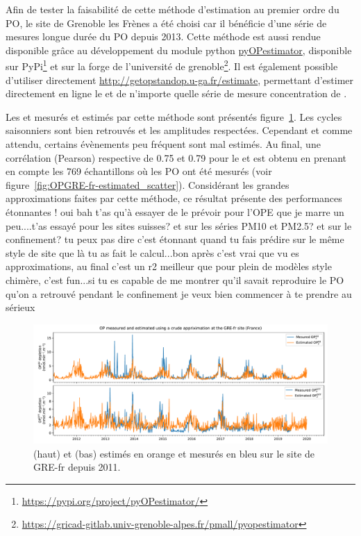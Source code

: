 Afin de tester la faisabilité de cette méthode d'estimation au premier ordre du PO, le
site de Grenoble les Frènes a été choisi car il bénéficie d'une série de mesures longue durée
du PO depuis 2013. Cette méthode est aussi rendue disponible grâce au développement du module python
\href{https://gricad-gitlab.univ-grenoble-alpes.fr/pmall/pyopestimator}{pyOPestimator},
disponible sur PyPi\footnote{\url{https://pypi.org/project/pyOPestimator/}} et sur la
forge de l'université de
grenoble\footnote{\url{https://gricad-gitlab.univ-grenoble-alpes.fr/pmall/pyopestimator}}.
Il est également possible d'utiliser directement
\url{http://getopstandop.u-ga.fr/estimate}, permettant d'estimer directement en ligne le
\POAAv{} et \PODTTv{} de n'importe quelle série de mesure concentration de \PMdix.

Les \POAAv{} et \PODTTv{} mesurés et estimés par cette méthode sont présentés
figure~\ref{fig:OPGRE-fr-estimated}.  Les cycles saisonniers sont bien retrouvés et les
amplitudes respectées. Cependant et comme attendu, certains évènements peu fréquent sont
mal estimés. Au final, une corrélation (Pearson) respective de 0.75 et 0.79 pour le
\POAAv{} et \PODTTv{} est obtenu en prenant en compte les 769 échantillons où les PO ont
été mesurés (voir figure~\ref{fig:OPGRE-fr-estimated_scatter}).  Considérant les grandes
approximations faites par cette méthode, ce résultat présente des performances étonnantes ! oui bah t'as qu'à essayer de le prévoir pour l'OPE que je marre un peu....t'as essayé pour les sites suisses? et sur les séries PM10 et PM2.5? et sur le confinement?  tu peux pas dire c'est étonnant quand tu fais prédire sur le même style de site que là tu as fait le calcul...bon après c'est vrai que vu es approximations, au final c'est un r2 meilleur que pour plein de modèles style chimère, c'est fun...si tu es capable de me montrer qu'il savait reproduire le PO qu'on a retrouvé pendant le confinement je veux bien commencer à te prendre au sérieux

\begin{figure}[ht]
    \centering
    \includegraphics[width=1.0\textwidth]{figures/chapter05/OPGRE-fr_estimated.pdf}
    \caption{\POAAv{} (haut) et \PODTTv{} (bas) estimés en orange et mesurés en bleu sur le site de GRE-fr depuis 2011.}
    \label{fig:OPGRE-fr-estimated}
\end{figure}
 
